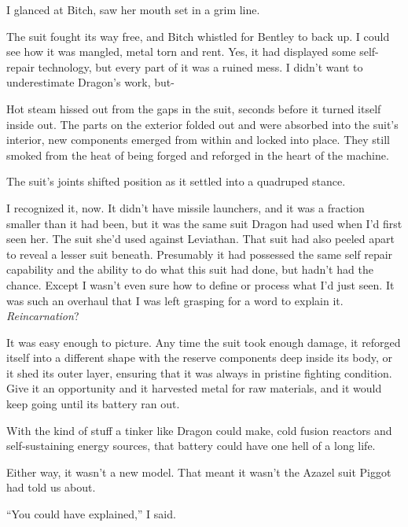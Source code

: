 I glanced at Bitch, saw her mouth set in a grim line.



The suit fought its way free, and Bitch whistled for Bentley to back up.  I could see how it was mangled, metal torn and rent.  Yes, it had displayed some self-repair technology, but every part of it was a ruined mess.  I didn't want to underestimate Dragon's work, but-



Hot steam hissed out from the gaps in the suit, seconds before it turned itself inside out.  The parts on the exterior folded out and were absorbed into the suit's interior, new components emerged from within and locked into place.  They still smoked from the heat of being forged and reforged in the heart of the machine.



The suit's joints shifted position as it settled into a quadruped stance.



I recognized it, now.  It didn't have missile launchers, and it was a fraction smaller than it had been, but it was the same suit Dragon had used when I'd first seen her.  The suit she'd used against Leviathan.  That suit had also peeled apart to reveal a lesser suit beneath.  Presumably it had possessed the same self repair capability and the ability to do what this suit had done, but hadn't had the chance.  Except I wasn't even sure how to define or process what I'd just seen.  It was such an overhaul that I was left grasping for a word to explain it.  \emph{Reincarnation}?



It was easy enough to picture.  Any time the suit took enough damage, it reforged itself into a different shape with the reserve components deep inside its body, or it shed its outer layer, ensuring that it was always in pristine fighting condition.  Give it an opportunity and it harvested metal for raw materials, and it would keep going until its battery ran out.



With the kind of stuff a tinker like Dragon could make, cold fusion reactors and self-sustaining energy sources, that battery could have one hell of a long life.



Either way, it wasn't a new model.  That meant it wasn't the Azazel suit Piggot had told us about.



``You could have explained,'' I said.



